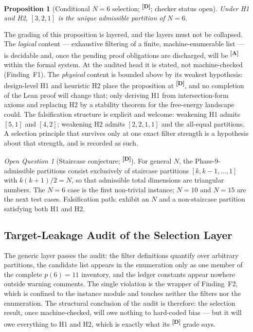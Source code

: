 \documentclass[12pt,a4paper,twoside]{article}
\theoremstyle{plain}
\newtheorem{proposition}[theorem]{Proposition}
\theoremstyle{definition}
\theoremstyle{remark}
\newtheorem{openquestion}{Open Question}
\newcommand{\catmark}[1]{\textsuperscript{\textsf{\textbf{[#1]}}}}
\begin{document}
\begin{proposition}[Conditional $N=6$ selection; \catmark{D}; checker
status open]
\label{prop:unique321}
Under H1 and H2, $[3,2,1]$ is the unique admissible partition of $N=6$.
\end{proposition}

The grading of this proposition is layered, and the layers must not be
collapsed. The \emph{logical} content --- exhaustive filtering of a
finite, machine-enumerable list --- is decidable and, once the pending
proof obligations are discharged, will be \catmark{A} within the formal
system. At the audited head it is stated, not machine-checked
(Finding~F1). The \emph{physical} content is bounded above by its
weakest hypothesis: design-level H1 and heuristic H2 place the
proposition at \catmark{D}, and no completion of the Lean proof will
change that; only deriving H1 from intersection-form axioms and replacing
H2 by a stability theorem for the free-energy landscape could. The
falsification structure is explicit and welcome: weakening H1 admits
$[5,1]$ and $[4,2]$; weakening H2 admits $[2,2,1,1]$ and the all-equal
partitions. A selection principle that survives only at one exact filter
strength is a hypothesis about that strength, and is recorded as such.

\begin{openquestion}[Staircase conjecture; \catmark{D}]
\label{oq:staircase}
For general $N$, the Phase-9-admissible partitions consist exclusively of
staircase partitions $[k, k{-}1, \ldots, 1]$ with $k(k{+}1)/2 = N$, so
that admissible total dimensions are triangular numbers. The $N=6$ case
is the first non-trivial instance; $N=10$ and $N=15$ are the next test
cases. Falsification path: exhibit an $N$ and a non-staircase partition
satisfying both H1 and H2.
\end{openquestion}

\subsection{Target-Leakage Audit of the Selection Layer}
\label{subsec:selection-leakage}

The generic layer passes the audit: the filter definitions quantify over
arbitrary partitions, the candidate list appears in the enumeration only
as one member of the complete $p(6) = 11$ inventory, and the ledger
constants appear nowhere outside warning comments. The single violation
is the wrapper of Finding~F2, which is confined to the instance module
and touches neither the filters nor the enumeration. The structural
conclusion of the audit is therefore: the selection result, once
machine-checked, will owe nothing to hard-coded bias --- but it will owe
everything to H1 and H2, which is exactly what its \catmark{D} grade
says.
\end{document}
